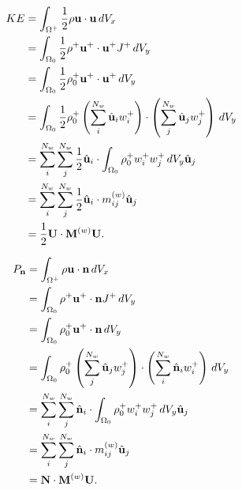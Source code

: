 \documentclass[11pt]{report}
\begin{document}
\begin{align}
    KE &= \int_{\Omega^+} \frac{1}{2} \rho \mathbf{u} \cdot \mathbf{u} \, dV_x \nonumber \\
    &= \int_{\Omega_0} \frac{1}{2} \rho^+ \mathbf{u}^+ \cdot \mathbf{u}^+ J^+ \, dV_y \nonumber \\
    &= \int_{\Omega_0} \frac{1}{2} \rho_0^+ \mathbf{u}^+ \cdot \mathbf{u}^+ \, dV_y \nonumber \\
    &= \int_{\Omega_0} \frac{1}{2} \rho_0^+ \left ( \sum_i^{N_w} \hat{\mathbf{u}}_i w_i^+ \right ) \cdot \left ( \sum_j^{N_w} \hat{\mathbf{u}}_j w_j^+ \right ) \, dV_y \nonumber \\
    &= \sum_i^{N_w} \sum_j^{N_w} \frac{1}{2} \hat{\mathbf{u}}_i \cdot \int_{\Omega_0}\rho_0^+ w_i^+ w_j^+ \, dV_y \hat{\mathbf{u}}_j \nonumber \\
    &= \sum_i^{N_w} \sum_j^{N_w} \frac{1}{2} \hat{\mathbf{u}}_i \cdot m_{ij}^{(w)} \hat{\mathbf{u}}_j \nonumber \\
    &= \frac{1}{2} \mathbf{U} \cdot \mathbf{M}^{(w)} \mathbf{U}.
\end{align}

\begin{align}
    P_{\mathbf{n}} &= \int_{\Omega^+} \rho \mathbf{u} \cdot \mathbf{n} \, dV_x \nonumber \\
    &= \int_{\Omega_0} \rho^+ \mathbf{u}^+ \cdot \mathbf{n} J^+ \, dV_y \nonumber \\
    &= \int_{\Omega_0} \rho^+_0 \mathbf{u}^+ \cdot \mathbf{n} \, dV_y \nonumber \\
    &= \int_{\Omega_0} \rho^+_0 \left ( \sum_j^{N_w} \hat{\mathbf{u}}_j w^+_j \right ) \cdot \left ( \sum_i^{N_w} \hat{\mathbf{n}}_i w_i^+ \right ) \, dV_y \nonumber \\
    &= \sum_i^{N_w} \sum_j^{N_w} \hat{\mathbf{n}}_i \cdot \int_{\Omega_0} \rho_0^+ w_i^+ w_j^+ \, dV_y \hat{\mathbf{u}}_j \nonumber \\
    &= \sum_i^{N_w} \sum_j^{N_w} \hat{\mathbf{n}}_i \cdot m_{ij}^{(w)} \hat{\mathbf{u}}_j \nonumber \\
    &= \mathbf{N} \cdot \mathbf{M}^{(w)} \mathbf{U}.
\end{align}
\end{document}

